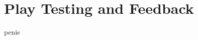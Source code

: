 \section{Play Testing and Feedback}

penis


\begin{comment}
    - messages/updates
    - better graphics
    - AI
\end{comment}
